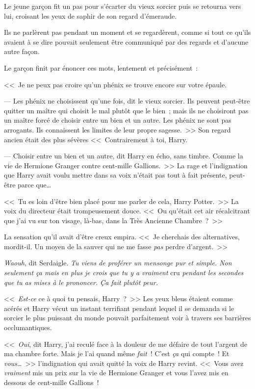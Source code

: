 Le jeune garçon fit un pas pour s'écarter du vieux sorcier puis se retourna vers lui, croisant les yeux de saphir de son regard d'émeraude.

Ils ne parlèrent pas pendant un moment et se regardèrent, comme si tout ce qu'ils avaient à se dire pouvait seulement être communiqué par des regards et d'aucune autre façon.

Le garçon finit par énoncer ces mots, lentement et précisément~:

<<~Je ne peux pas croire qu'un phénix se trouve encore sur votre épaule.

--- Les phénix ne choisissent qu'une fois, dit le vieux sorcier. Ils peuvent peut-être quitter un maître qui choisit le mal plutôt que le bien~; mais ils ne choisiront pas un maître forcé de choisir entre un bien et un autre. Les phénix ne sont pas arrogants. Ils connaissent les limites de leur propre sagesse.~>> Son regard ancien était des plus sévères <<~Contrairement à toi, Harry.

--- Choisir entre un bien et un autre, dit Harry en écho, sans timbre. Comme la vie de Hermione Granger contre cent-mille Gallions.~>> La rage et l'indignation que Harry avait voulu mettre dans sa voix n'était pas tout à fait présente, peut-être parce que…

<<~Tu es loin d'être bien placé pour me parler de cela, Harry Potter.~>> La voix du directeur était trompeusement douce. <<~Ou qu'était cet air récalcitrant que j'ai vu sur ton visage, là-bas, dans la Très Ancienne Chambre~?~>>

La sensation qu'il avait d'être creux empira. <<~Je cherchais des alternatives, mordit-il. Un moyen de la sauver qui ne me fasse \emph{pas} perdre d'argent.~>>

\emph{Waouh}, dit Serdaigle. \emph{Tu viens de proférer un mensonge pur et simple. Non seulement ça mais en plus je crois que tu y a vraiment} cru \emph{pendant les secondes que tu as mises à le prononcer. Ça fait plutôt peur.}

<<~\emph{Est-ce} ce à quoi tu pensais, Harry~?~>> Les yeux bleus étaient comme acérés et Harry vécut un instant terrifiant pendant lequel il se demanda si le sorcier le plus puissant du monde pouvait parfaitement voir à travers ses barrières occlumantiques.

<<~\emph{Oui}, dit Harry, j'ai reculé face à la douleur de me défaire de tout l'argent de ma chambre forte. Mais je l'ai quand même \emph{fait}~! C'est \emph{ça} qui compte~! Et \emph{vous…}~>> l'indignation qui avait quitté la voix de Harry revint. <<~Vous avez \emph{vraiment} mis un prix sur la vie de Hermione Granger et vous l'avez mis en dessous de cent-mille Gallions~!

